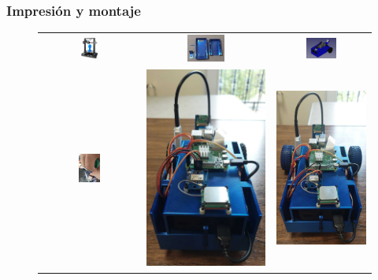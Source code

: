 \documentclass{beamer}
\begin{document}
\begin{frame}
	\frametitle{Impresión y montaje}
	\begin{figure}
		\centering
		\begin{tabular}{ccc} %
			\includegraphics[width=0.18\textwidth]{figs/impresora.jpg} & 
			\includegraphics[width=0.31\textwidth]{figs/setcompleto.jpeg} & 
			\includegraphics[width=0.34\textwidth]{figs/completo3.png} \\[10pt]
			\includegraphics[width=0.23\textwidth]{figs/soldar.jpeg} & 
			\includegraphics[height=0.31\textwidth]{figs/ab.jpeg} & 
			\includegraphics[height=0.31\textwidth]{figs/ra.jpeg}		
		\end{tabular}
	\end{figure}
\end{frame}
\end{document}
